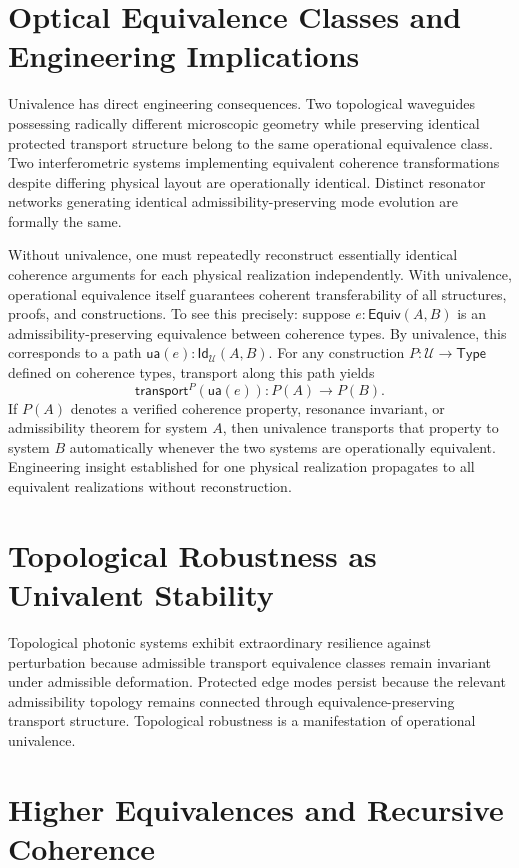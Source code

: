 \documentclass[11pt,openany]{book}
\theoremstyle{definition}
\theoremstyle{plain}
\newcommand{\Type}{\mathsf{Type}}
\newcommand{\idtype}{\mathsf{Id}}
\newcommand{\transport}{\mathsf{transport}}
\newcommand{\Equiv}{\mathsf{Equiv}}
\begin{document}
\section{Optical Equivalence Classes and Engineering Implications}

Univalence has direct engineering consequences. Two topological waveguides possessing radically different microscopic geometry while preserving identical protected transport structure belong to the same operational equivalence class. Two interferometric systems implementing equivalent coherence transformations despite differing physical layout are operationally identical. Distinct resonator networks generating identical admissibility-preserving mode evolution are formally the same.

Without univalence, one must repeatedly reconstruct essentially identical coherence arguments for each physical realization independently. With univalence, operational equivalence itself guarantees coherent transferability of all structures, proofs, and constructions. To see this precisely: suppose $e : \Equiv(A,B)$ is an admissibility-preserving equivalence between coherence types. By univalence, this corresponds to a path $\mathsf{ua}(e) : \idtype_{\mathcal{U}}(A,B)$. For any construction $P : \mathcal{U} \to \Type$ defined on coherence types, transport along this path yields
\[
\transport^P(\mathsf{ua}(e)) : P(A) \to P(B).
\]
If $P(A)$ denotes a verified coherence property, resonance invariant, or admissibility theorem for system $A$, then univalence transports that property to system $B$ automatically whenever the two systems are operationally equivalent. Engineering insight established for one physical realization propagates to all equivalent realizations without reconstruction.

\section{Topological Robustness as Univalent Stability}

Topological photonic systems exhibit extraordinary resilience against perturbation because admissible transport equivalence classes remain invariant under admissible deformation. Protected edge modes persist because the relevant admissibility topology remains connected through equivalence-preserving transport structure. Topological robustness is a manifestation of operational univalence.

\section{Higher Equivalences and Recursive Coherence}
\end{document}
